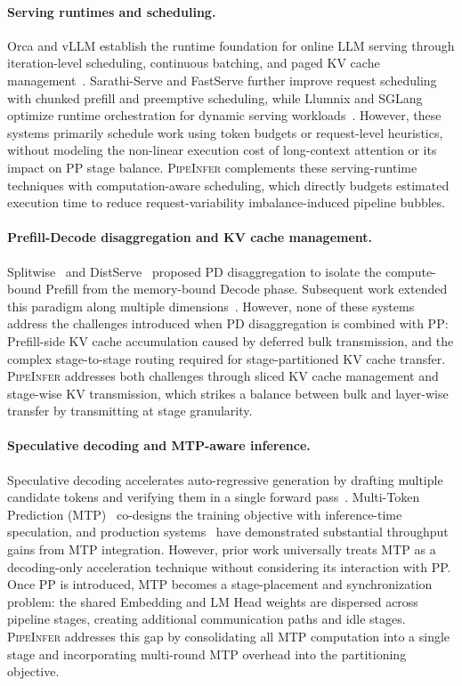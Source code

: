 \documentclass[12pt,a4paper]{article}
\newcommand{\sys}{\textsc{PipeInfer}\xspace}
\newcommand{\Prefillterm}{Prefill\xspace}
\newcommand{\Decodeterm}{Decode\xspace}
\newcommand{\kvcache}{KV cache\xspace}
\newcommand{\requestimb}{request-variability imbalance\xspace}
\newcommand{\slicedkv}{sliced KV cache management\xspace}
\newcommand{\stagekv}{stage-wise KV transmission\xspace}
\newcommand{\timesched}{computation-aware scheduling\xspace}
\begin{document}
\paragraph{Serving runtimes and scheduling.}
Orca and vLLM establish the runtime foundation for online LLM serving through iteration-level scheduling, continuous batching, and paged \kvcache management~\cite{orca,vllm}.
Sarathi-Serve and FastServe further improve request scheduling with chunked prefill and preemptive scheduling, while Llumnix and SGLang optimize runtime orchestration for dynamic serving workloads~\cite{sarathi,fastserve,llumnix,sglang}.
However, these systems primarily schedule work using token budgets or request-level heuristics, without modeling the non-linear execution cost of long-context attention or its impact on PP stage balance.
\sys complements these serving-runtime techniques with \timesched, which directly budgets estimated execution time to reduce \requestimb-induced pipeline bubbles.

\paragraph{Prefill-Decode disaggregation and KV cache management.}
Splitwise~\cite{splitwise} and DistServe~\cite{distserve} proposed PD disaggregation to isolate the compute-bound \Prefillterm from the memory-bound \Decodeterm phase.
Subsequent work extended this paradigm along multiple dimensions~\cite{dejavu,mooncake,memserve,pdserve,tetriinfer,flowkv,infinigen,cloudmatrix384}.
However, none of these systems address the challenges introduced when PD disaggregation is combined with PP: \Prefillterm-side \kvcache accumulation caused by deferred bulk transmission, and the complex stage-to-stage routing required for stage-partitioned \kvcache transfer.
\sys addresses both challenges through \slicedkv and \stagekv, which strikes a balance between bulk and layer-wise transfer by transmitting at stage granularity.

\paragraph{Speculative decoding and MTP-aware inference.}
Speculative decoding accelerates auto-regressive generation by drafting multiple candidate tokens and verifying them in a single forward pass~\cite{eagle,medusa,specinfer}.
Multi-Token Prediction (MTP)~\cite{mtp,deepseekv3,eagle} co-designs the training objective with inference-time speculation, and production systems~\cite{omniinfer,cloudmatrix384} have demonstrated substantial throughput gains from MTP integration.
However, prior work universally treats MTP as a decoding-only acceleration technique without considering its interaction with PP.
Once PP is introduced, MTP becomes a stage-placement and synchronization problem: the shared Embedding and LM Head weights are dispersed across pipeline stages, creating additional communication paths and idle stages.
\sys addresses this gap by consolidating all MTP computation into a single stage and incorporating multi-round MTP overhead into the partitioning objective.
\end{document}
